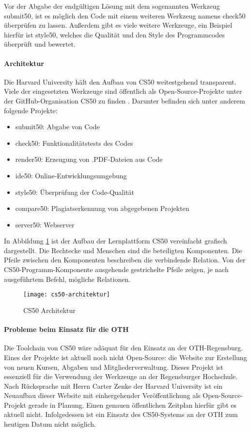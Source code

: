 Vor der Abgabe der endgültigen Lösung mit dem sogenannten Werkzeug
\glqq submit50\grqq{}, ist es möglich den Code mit einem weiteren Werkzeug
namens \glqq check50\grqq{} überprüfen zu lassen. Außerdem gibt es viele weitere
Werkzeuge, ein Beispiel hierfür ist \glqq style50\grqq{}, welches die Qualität
und den Style des Programmcodes überprüft und bewertet. \cite{submit50}

\paragraph{Architektur}
Die Harvard University hält den Aufbau von CS50 weitestgehend transparent.
Viele der eingesetzten Werkzeuge sind öffentlich als Open-Source-Projekte unter
der GitHub-Organisation \glqq CS50\grqq{} zu finden \cite{cs50-github}. Darunter
befinden sich unter anderem folgende Projekte:
\begin{itemize}
\item submit50: Abgabe von Code
\item check50: Funktionalitätstests des Codes
\item render50: Erzeugung von .PDF-Dateien aus Code
\item ide50: Online-Entwicklungsumgebung
\item style50: Überprüfung der Code-Qualität
\item compare50: Plagiatserkennung von abgegebenen Projekten
\item server50: Webserver
\end{itemize}

\newpage

In Abbildung \ref{fig:cs50-architektur} ist der Aufbau der Lernplattform CS50
vereinfacht grafisch dargestellt. Die Rechtecke und Menschen sind die
beteiligten Komponenten. Die Pfeile zwischen den Komponenten beschreiben die
verbindende Relation. Von der \glqq CS50-Programm\grqq-Komponente ausgehende gestrichelte Pfeile zeigen, je nach ausgeführtem Befehl, mögliche Relationen.

\begin{figure}[h]
    \centering
    \texttt{[image: cs50-architektur]}
    \caption{CS50 Architektur}
    \label{fig:cs50-architektur}
\end{figure}

\paragraph{Probleme beim Einsatz für die OTH}
Die Toolchain von CS50 wäre adäquat für den Einsatz an der OTH-Regensburg.
Eines der Projekte ist aktuell noch nicht Open-Source: die Website zur
Erstellung von neuen Kursen, Abgaben und Mitgliederverwaltung. Dieses Projekt
ist essenziell für die Verwendung der Werkzeuge an der Regensburger Hochschule.
Nach Rücksprache mit Herrn Carter Zenke der Harvard University ist ein Neuaufbau
dieser Website mit einhergehender Veröffentlichung als Open-Source-Projekt
gerade in Planung. Einen genauen öffentlichen Zeitplan hierfür gibt es aktuell
nicht. Infolgedessen ist ein Einsatz des CS50-Systems an der OTH zum heutigen
Datum nicht möglich.

